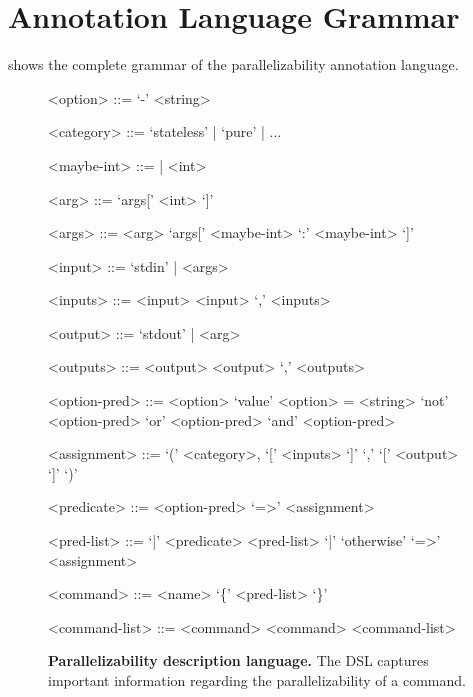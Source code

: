 \documentclass[letterpaper,twocolumn,10pt]{article}
\begin{document}




\appendix

\section{Annotation Language Grammar}
\label{alg}

 shows the complete grammar of the parallelizability
annotation language.

\begin{figure}
  \centering
  \begin{grammar}
    <option> ::= `-' <string>

    <category> ::= `stateless' | `pure' | ...

    <maybe-int> ::= | <int>

    <arg> ::= `args[' <int> `]'

    <args> ::= <arg>
    \alt `args[' <maybe-int> `:' <maybe-int> `]'

    <input> ::= `stdin' | <args>

    <inputs> ::= <input>
    \alt <input> `,' <inputs>

    <output> ::= `stdout' | <arg>

    <outputs> ::= <output>
    \alt <output> `,' <outputs>

    <option-pred> ::= <option>
    \alt `value' <option> = <string>
    \alt `not' <option-pred>
     `or' <option-pred>
     `and' <option-pred>

    <assignment> ::= `(' <category>, `[' <inputs> `]' `,' `[' <output> `]' `)'

    <predicate> ::= <option-pred> `=>' <assignment>

    <pred-list> ::= `|' <predicate> <pred-list>
    \alt `|' `otherwise' `=>' <assignment>

    <command> ::= <name> `\{' <pred-list> `\}'

    <command-list> ::= <command>
    \alt <command> <command-list>
  \end{grammar}
  \caption{
  \textbf{Parallelizability description language.}
    The DSL captures important information regarding the parallelizability of a command.
  }
  \label{fig:dsl}
\end{figure}


\end{document}
